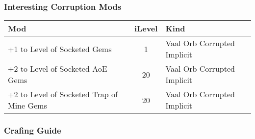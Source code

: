 \subsubsection{Interesting Corruption Mods}
\begin{tabular}{|l|c|l|}
	\hline
	Mod&iLevel&Kind\\\hline
	+1 to Level of Socketed Gems&1& Vaal Orb Corrupted Implicit \\\hline
	+2 to Level of Socketed AoE Gems&20& Vaal Orb Corrupted Implicit \\\hline
	+2 to Level of Socketed Trap of Mine Gems&20& Vaal Orb Corrupted Implicit \\\hline
\end{tabular}

\subsubsection{Crafing Guide}
